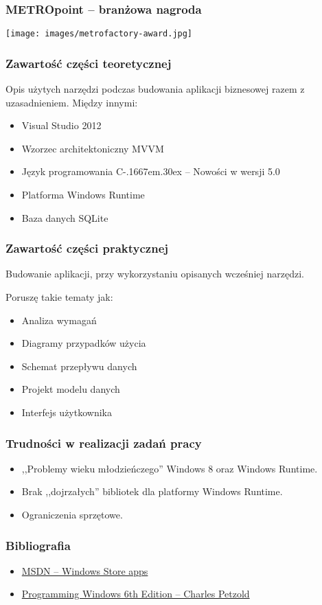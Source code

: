 \documentclass{beamer}
\def\Csharp{%
    C\kern-.1667em\raise.30ex\hbox{\smaller{\#}}%
 }
\begin{document}
\begin{frame}
\frametitle{\textbf{METRO}point -- branżowa nagroda}
 \texttt{[image: images/metrofactory-award.jpg]}
\end{frame}

\begin{frame}
\frametitle{Zawartość części teoretycznej}
Opis użytych narzędzi podczas budowania aplikacji biznesowej razem z uzasadnieniem.
Między innymi:
\begin{itemize}[<+->]
\item Visual Studio 2012
\item Wzorzec architektoniczny MVVM
\item Język programowania \Csharp -- Nowości w wersji 5.0
\item Platforma Windows Runtime
\item Baza danych SQLite
\end{itemize}
\end{frame}

\begin{frame}
\frametitle{Zawartość części praktycznej}
Budowanie aplikacji, przy wykorzystaniu opisanych wcześniej narzędzi.

Poruszę takie tematy jak:
\begin{itemize}[<+->]
\item Analiza wymagań
\item Diagramy przypadków użycia
\item Schemat przepływu danych
\item Projekt modelu danych
\item Interfejs użytkownika
\end{itemize}
\end{frame}

\begin{frame}
\frametitle{Trudności w realizacji zadań pracy}

\begin{itemize}[<+->]
\item ,,Problemy wieku młodzieńczego'' Windows 8 oraz Windows Runtime.
\item Brak ,,dojrzałych'' bibliotek dla platformy Windows Runtime.
\item Ograniczenia sprzętowe.

\end{itemize}
\end{frame}


\begin{frame}
\frametitle{Bibliografia} 
\begin{itemize}
\item \href{http://msdn.microsoft.com/en-us/windows/apps/}{MSDN -- Windows Store apps}
\item \href{http://www.charlespetzold.com/blog/2013/01/Programming-Windows-6th-Edition-Final-Ebook-Now-Available.html}{Programming Windows 6th Edition -- Charles Petzold}
\end{itemize}
\end{frame}
\end{document}
